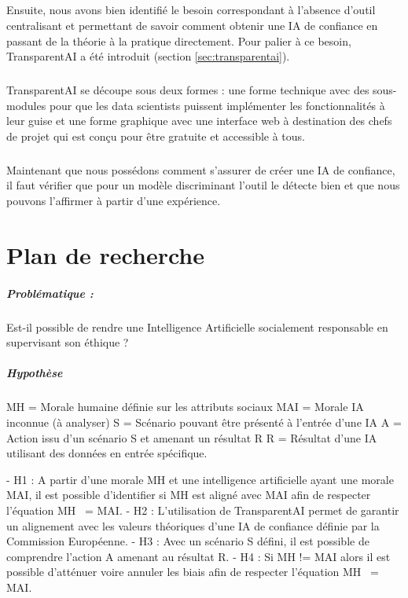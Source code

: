 \documentclass[10pt, french, a4paper]{report}
\begin{document}
\paragraph{}
Ensuite, nous avons bien identifié le besoin correspondant à l'absence d'outil centralisant et permettant de savoir comment obtenir une IA de confiance en passant de la théorie à la pratique directement. Pour palier à ce besoin, TransparentAI a été introduit (section \ref{sec:transparentai}).

\paragraph{}
TransparentAI se découpe sous deux formes : une forme technique avec des sous-modules pour que les data scientists puissent implémenter les fonctionnalités à leur guise et une forme graphique avec une interface web à destination des chefs de projet qui est conçu pour être gratuite et accessible à tous.

\paragraph{}
Maintenant que nous possédons comment s'assurer de créer une IA de confiance, il faut vérifier que pour un modèle discriminant l'outil le détecte bien et que nous pouvons l'affirmer à partir d'une expérience.

\newpage
\chapter{Plan de recherche}


\paragraph{Problématique :}
Est-il possible de rendre une Intelligence Artificielle socialement responsable en supervisant son éthique ?

\paragraph{Hypothèse}
MH = Morale humaine définie sur les attributs sociaux 
MAI = Morale IA inconnue (à analyser)
S = Scénario pouvant être présenté à l'entrée d'une IA
A = Action issu d'un scénario S et amenant un résultat R
R = Résultat d'une IA utilisant des données en entrée spécifique.

- H1 : A partir d'une morale MH et une intelligence artificielle ayant une morale MAI, il est possible d'identifier si MH est aligné avec MAI afin de respecter l'équation MH ~= MAI.
- H2 : L'utilisation de TransparentAI permet de garantir un alignement avec les valeurs théoriques d'une IA de confiance définie par la Commission Européenne.
- H3 : Avec un scénario S défini, il est possible de comprendre l'action A amenant au résultat R.
- H4 : Si MH != MAI alors il est possible d'atténuer voire annuler les biais afin de respecter l'équation MH ~= MAI.
\end{document}
